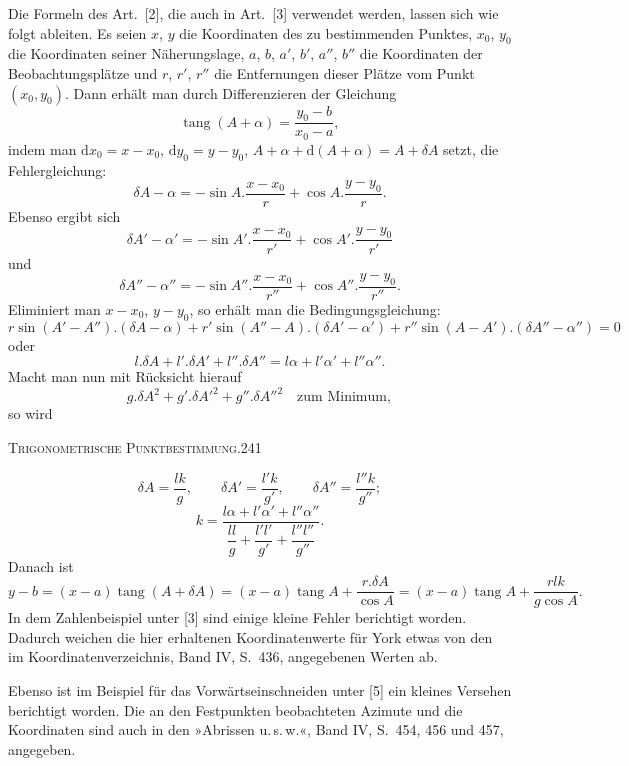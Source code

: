 Die Formeln des Art.~[2], die auch in Art.~[3] verwendet werden, lassen sich wie folgt ableiten. Es seien $x$, $y$ die Koordinaten des zu bestimmenden Punktes, $x_0$, $y_0$ die Koordinaten seiner Näherungslage, $a$, $b$, $a'$, $b'$, $a''$, $b''$ die Koordinaten der Beobachtungsplätze und $r$, $r'$, $r''$ die Entfernungen dieser Plätze vom Punkt $(x_0,y_0)$. Dann erhält man durch Differenzieren der Gleichung
\[
\operatorname{tang}(A+\alpha)=\frac{y_0-b}{x_0-a},
\]
indem man $\mathrm dx_0=x-x_0$, $\mathrm dy_0=y-y_0$, $A+\alpha+\mathrm d(A+\alpha)=A+\delta A$ setzt, die Fehlergleichung:
\[
\delta A-\alpha=-\sin A.\frac{x-x_0}{r}+\cos A.\frac{y-y_0}{r}.
\]
Ebenso ergibt sich
\[
\delta A'-\alpha'=-\sin A'.\frac{x-x_0}{r'}+\cos A'.\frac{y-y_0}{r'}
\]
und
\[
\delta A''-\alpha''=-\sin A''.\frac{x-x_0}{r''}+\cos A''.\frac{y-y_0}{r''}.
\]
Eliminiert man $x-x_0$, $y-y_0$, so erhält man die Bedingungsgleichung:
\[
r\sin(A'-A'').(\delta A-\alpha)+r'\sin(A''-A).(\delta A'-\alpha')+r''\sin(A-A').(\delta A''-\alpha'')=0
\]
oder
\[
l.\delta A+l'.\delta A'+l''.\delta A''=l\alpha+l'\alpha'+l''\alpha''.
\]
Macht man nun mit Rücksicht hierauf
\[
g.\delta A^2+g'.\delta A'^2+g''.\delta A''^2\quad\text{zum Minimum},
\]
so wird
\par\endgroup

\clearpage
\noindent\mbox{}\hfill\textsc{Trigonometrische Punktbestimmung.}\hfill241\par\medskip
\begingroup\footnotesize
\[
\delta A=\frac{lk}{g},\qquad\delta A'=\frac{l'k}{g'},\qquad\delta A''=\frac{l''k}{g''};
\]
\[
k=\frac{l\alpha+l'\alpha'+l''\alpha''}{\dfrac{ll}{g}+\dfrac{l'l'}{g'}+\dfrac{l''l''}{g''}}.
\]
Danach ist
\[
y-b=(x-a)\operatorname{tang}(A+\delta A)=(x-a)\operatorname{tang}A+\frac{r.\delta A}{\cos A}
=(x-a)\operatorname{tang}A+\frac{rlk}{g\cos A}.
\]
In dem Zahlenbeispiel unter [3] sind einige kleine Fehler berichtigt worden. Dadurch weichen die hier erhaltenen Koordinatenwerte für York etwas von den im Koordinatenverzeichnis, Band IV, S.~436, angegebenen Werten ab.

Ebenso ist im Beispiel für das Vorwärtseinschneiden unter [5] ein kleines Versehen berichtigt worden. Die an den Festpunkten beobachteten Azimute und die Koordinaten sind auch in den »Abrissen u.\,s.\,w.«, Band IV, S.~454, 456 und 457, angegeben.

